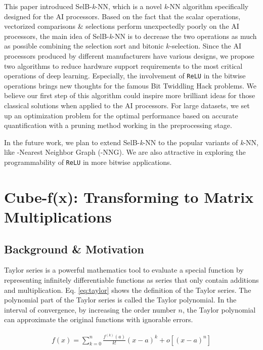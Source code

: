 \documentclass[12pt]{extbook}
\begin{document}
This paper introduced SelB-\textit{k}-NN, which is a novel \textit{k}-NN algorithm specifically designed for the AI processors. Based on the fact that the scalar operations, vectorized comparisons \& selections perform unexpectedly poorly on the AI processors, the main idea of SelB-\textit{k}-NN is to decrease the two operations as much as possible combining the selection sort and bitonic $k$-selection. Since the AI processors produced by different manufacturers have various designs, we propose two algorithms to reduce hardware support requirements to the most critical operations of deep learning. Especially, the involvement of \verb|ReLU| in the bitwise operations brings new thoughts for the famous Bit Twiddling Hack problems. We believe our first step of this algorithm could inspire more brilliant ideas for those classical solutions when applied to the AI processors. For large datasets, we set up an optimization problem for the optimal performance based on accurate quantification with a pruning method working in the preprocessing stage.

In the future work, we plan to extend SelB-\textit{k}-NN to the popular variants of \textit{k}-NN, like -Nearest Neighbor Graph (-NNG). We are also attractive in exploring the programmability of \verb|ReLU| in more bitwise applications.



\chapter{Cube-f(x): Transforming to Matrix Multiplications}
\label{sec_4}

\section{Background \& Motivation \label{sec:2}}

Taylor series is a powerful mathematics tool to evaluate a special function by representing infinitely differentiable functions as series that only contain additions and multiplication. Eq. \ref{eq:taylor} shows the definition of the Taylor series. The polynomial part of the Taylor series is called the Taylor polynomial. In the interval of convergence, by increasing the order number $n$, the Taylor polynomial can approximate the original functions with ignorable errors.

\begin{equation}
    \label{eq:taylor}
    \begin{aligned}
    f(x) = \sum_{k = 0}^{n}\frac{f^{(k)}(a)}{k!}(x - a)^k + o[(x - a) ^ n]
    \end{aligned}
    \end{equation}
\end{document}
